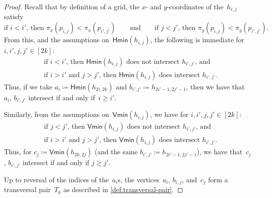 \documentclass[a4paper,UKenglish,cleveref,thm-restate]{lipics-v2021}
\theoremstyle{remark}
\newcommand{\eqdef}{\coloneqq}
\newcommand{\Xco}{\pi_x}
\newcommand{\Yco}{\pi_y}
\newcommand{\hormin}{\ensuremath{\mathsf{Hmin}}}
\newcommand{\vermin}{\ensuremath{\mathsf{Vmin}}}
\begin{document}
\begin{proof}
    Recall that by definition of a grid, the $x$- and $y$-coordinates of the~$h_{i,j}$ satisfy
    \[ \text{if $i<i'$, then $\Xco(p_{i,j}) < \Xco(p_{i',j'})$} \qquad \text{and} \qquad \text{if $j<j'$, then $\Yco(p_{i,j}) < \Yco(p_{i',j'})$}. \]
    From this, and the assumptions on~$\hormin(h_{i,j})$, the following is immediate for $i,i',j,j' \in [2k]$:
    \begin{align}
        & \text{if $i<i'$, then $\hormin(h_{i,j})$ does not intersect $h_{i',j'}$, and} \\
        & \text{if $i>i'$ and $j>j'$, then $\hormin(h_{i,j})$ does intersect $h_{i',j'}$.}
    \end{align}
    Thus, if we take $a_i \eqdef \hormin(h_{2i,2k})$ and $b_{i',j'} \eqdef h_{2i'-1,2j'-1}$,
    then we have that~$a_i$, $b_{i',j'}$ intersect if and only if~$i \ge i'$.

    Similarly, from the assumptions on~$\vermin(h_{i,j})$, we have for $i,i',j,j' \in [2k]$:
    \begin{align}
        & \text{if $j<j'$, then $\vermin(h_{i,j})$ does not intersect $h_{i',j'}$, and} \\
        & \text{if $i>i'$ and $j>j'$, then $\vermin(h_{i,j})$ does intersect $h_{i',j'}$.}
    \end{align}
    Thus, for $c_j \eqdef \vermin(h_{2k,2j})$ (and the same $b_{i',j'} \eqdef h_{2i'-1,2j'-1}$),
    we have that~$c_j$, $b_{i',j'}$ intersect if and only if $j \ge j'$.
    
    Up to reversal of the indices of the~$a_i$s, the vertices~$a_i$, $b_{i,j}$, and~$c_j$ form a transversal pair~$T_k$ as described in \cref{def:transversal-pair}.
\end{proof}
\end{document}
